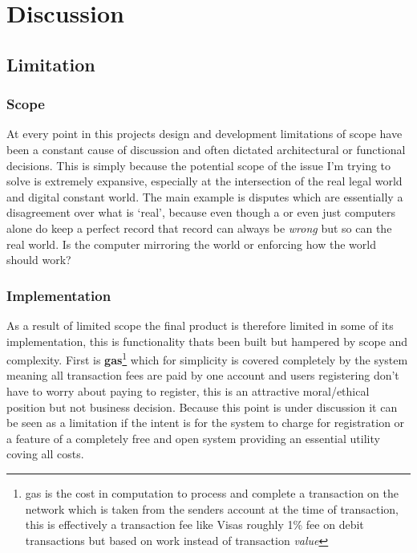 \section{Discussion}
\subsection{Limitation}

\subsubsection{Scope}

At every point in this projects design and development limitations of scope have been a constant cause of discussion and often dictated architectural or functional decisions. This is simply because the potential scope of the issue I'm trying to solve is extremely expansive, especially at the intersection of the real legal world and digital constant world. The main example is disputes which are essentially a disagreement over what is `real', because even though a  or even just computers alone do keep a perfect record that record can always be \textit{wrong} but so can the real world. Is the computer mirroring the world or enforcing how the world should work?

\subsubsection{Implementation}

As a result of limited scope the final product is therefore limited in some of its implementation, this is functionality thats been built but hampered by scope and complexity. First is \textbf{gas}\footnote{gas is the cost in computation to process and complete a transaction on the  network which is taken from the senders account at the time of transaction, this is effectively a transaction fee like Visas roughly 1\% fee on debit transactions but based on work instead of transaction \textit{value}} which for simplicity is covered completely by the system meaning all transaction fees are paid by one account and users registering don't have to worry about paying to register, this is an attractive moral/ethical position but not business decision. Because this point is under discussion it can be seen as a limitation if the intent is for the system to charge for registration or a feature of a completely free and open system providing an essential utility coving all costs.

